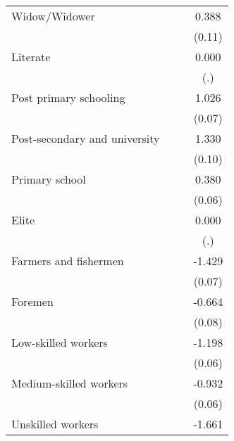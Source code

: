 {\begin{tabular}{l*{3}{c}}
Widow/Widower       &                     &                     &       0.388\sym{***}\\
                    &                     &                     &      (0.11)         \\
Literate            &                     &                     &       0.000         \\
                    &                     &                     &         (.)         \\
Post primary schooling&                     &                     &       1.026\sym{***}\\
                    &                     &                     &      (0.07)         \\
Post-secondary and university&                     &                     &       1.330\sym{***}\\
                    &                     &                     &      (0.10)         \\
Primary school      &                     &                     &       0.380\sym{***}\\
                    &                     &                     &      (0.06)         \\
Elite               &                     &                     &       0.000         \\
                    &                     &                     &         (.)         \\
Farmers and fishermen&                     &                     &      -1.429\sym{***}\\
                    &                     &                     &      (0.07)         \\
Foremen             &                     &                     &      -0.664\sym{***}\\
                    &                     &                     &      (0.08)         \\
Low-skilled workers &                     &                     &      -1.198\sym{***}\\
                    &                     &                     &      (0.06)         \\
Medium-skilled workers&                     &                     &      -0.932\sym{***}\\
                    &                     &                     &      (0.06)         \\
Unskilled workers   &                     &                     &      -1.661\sym{***}\\

\end{tabular}}
